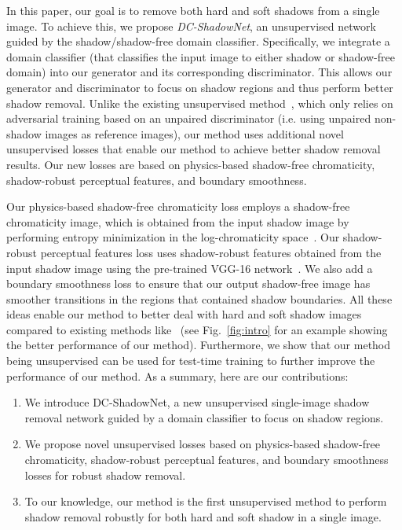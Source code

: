 \documentclass[10pt,twocolumn,letterpaper]{article}
\begin{document}
In this paper, our goal is to remove both hard and soft shadows from a single image. 
To achieve this, we propose {\it DC-ShadowNet}, an unsupervised network guided by the shadow/shadow-free domain classifier. 
Specifically, we integrate a domain classifier (that classifies the input image to either shadow or shadow-free domain) into our generator and its corresponding discriminator.
This allows our generator and discriminator to focus on shadow regions and thus perform better shadow removal.
Unlike the existing unsupervised method~\cite{Hu19}, which only relies on adversarial training based on an unpaired discriminator (i.e. using unpaired non-shadow images as reference images), our method uses additional novel unsupervised losses that enable our method to achieve better shadow removal results. 
Our new losses are based on physics-based shadow-free chromaticity, shadow-robust perceptual features, and boundary smoothness.


Our physics-based shadow-free chromaticity loss employs a shadow-free chromaticity image, which is obtained from the input shadow image by performing entropy minimization in the log-chromaticity space~\cite{Finlayson05}.
Our shadow-robust perceptual features loss uses shadow-robust features obtained from the input shadow image using the pre-trained VGG-16 network~\cite{Johnson16}. 
We also add a boundary smoothness loss to ensure that our output shadow-free image has smoother transitions in the regions that contained shadow boundaries. 
All these ideas enable our method to better deal with hard and soft shadow images compared to existing methods like~\cite{Hu19} (see Fig.~\ref{fig:intro} for an example showing the better performance of our method).   
Furthermore, we show that our method being unsupervised can be used for test-time training to further improve the performance of our method. 
As a summary, here are our contributions:
\begin{enumerate}[noitemsep,topsep=1pt]
	\item We introduce DC-ShadowNet, a new unsupervised single-image shadow removal network guided by a domain classifier  to focus on shadow regions.  
\item We propose novel unsupervised losses based on physics-based shadow-free chromaticity, shadow-robust perceptual features, and boundary smoothness losses for robust shadow removal.
\item To our knowledge, our method is the first unsupervised method to perform shadow removal robustly for both hard and soft shadow in a single image.
\end{enumerate}
 
\end{document}
